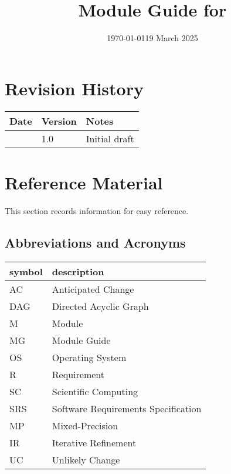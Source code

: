 \documentclass[12pt, titlepage]{article}
\begin{document}
\title{Module Guide for \progname{}}
\author{\authname}
\date{\today}

\maketitle


\section{Revision History}

\begin{tabularx}{\textwidth}{p{3cm}p{2cm}X}
\toprule {\bf Date} & {\bf Version} & {\bf Notes}\\
\midrule
\date{19 March 2025} & 1.0 & Initial draft \\
\bottomrule
\end{tabularx}

\newpage

\section{Reference Material}

This section records information for easy reference.

\subsection{Abbreviations and Acronyms}

\renewcommand{\arraystretch}{1.2}
\begin{tabular}{l l}
  \toprule
  \textbf{symbol} & \textbf{description}\\
  \midrule
  AC & Anticipated Change\\
  DAG & Directed Acyclic Graph \\
  M & Module \\
  MG & Module Guide \\
  OS & Operating System \\
  R & Requirement \\
  SC & Scientific Computing \\
  SRS & Software Requirements Specification \\
  MP & Mixed-Precision \\
  IR & Iterative Refinement \\
  UC & Unlikely Change \\
  \bottomrule
\end{tabular}\\
\end{document}
